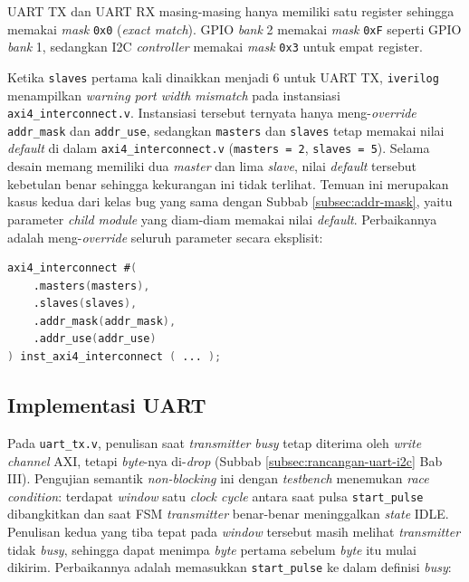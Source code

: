 UART TX dan UART RX masing-masing hanya memiliki satu register sehingga memakai \textit{mask} \texttt{0x0} (\textit{exact match}). GPIO \textit{bank} 2 memakai \textit{mask} \texttt{0xF} seperti GPIO \textit{bank} 1, sedangkan I2C \textit{controller} memakai \textit{mask} \texttt{0x3} untuk empat register.

Ketika \texttt{slaves} pertama kali dinaikkan menjadi 6 untuk UART TX, \texttt{iverilog} menampilkan \textit{warning port width mismatch} pada instansiasi \texttt{axi4\_interconnect.v}. Instansiasi tersebut ternyata hanya meng-\textit{override} \texttt{addr\_mask} dan \texttt{addr\_use}, sedangkan \texttt{masters} dan \texttt{slaves} tetap memakai nilai \textit{default} di dalam \texttt{axi4\_interconnect.v} (\texttt{masters = 2}, \texttt{slaves = 5}). Selama desain memang memiliki dua \textit{master} dan lima \textit{slave}, nilai \textit{default} tersebut kebetulan benar sehingga kekurangan ini tidak terlihat. Temuan ini merupakan kasus kedua dari kelas bug yang sama dengan Subbab \ref{subsec:addr-mask}, yaitu parameter \textit{child module} yang diam-diam memakai nilai \textit{default}. Perbaikannya adalah meng-\textit{override} seluruh parameter secara eksplisit:

\begin{lstlisting}[language=Verilog]
axi4_interconnect #(
    .masters(masters),
    .slaves(slaves),
    .addr_mask(addr_mask),
    .addr_use(addr_use)
) inst_axi4_interconnect ( ... );
\end{lstlisting}

\subsection{Implementasi UART}
\label{subsec:impl-uart}

Pada \texttt{uart\_tx.v}, penulisan saat \textit{transmitter} \textit{busy} tetap diterima oleh \textit{write channel} AXI, tetapi \textit{byte}-nya di-\textit{drop} (Subbab \ref{subsec:rancangan-uart-i2c} Bab III). Pengujian semantik \textit{non-blocking} ini dengan \textit{testbench} menemukan \textit{race condition}: terdapat \textit{window} satu \textit{clock cycle} antara saat pulsa \texttt{start\_pulse} dibangkitkan dan saat FSM \textit{transmitter} benar-benar meninggalkan \textit{state} IDLE. Penulisan kedua yang tiba tepat pada \textit{window} tersebut masih melihat \textit{transmitter} tidak \textit{busy}, sehingga dapat menimpa \textit{byte} pertama sebelum \textit{byte} itu mulai dikirim. Perbaikannya adalah memasukkan \texttt{start\_pulse} ke dalam definisi \textit{busy}:

